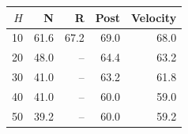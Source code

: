 \begin{tabular}{rrrrr}
\toprule
$H$ & N & R & Post & Velocity \\
\midrule
10 & 61.6 & 67.2 & 69.0 & 68.0 \\
20 & 48.0 & -- & 64.4 & 63.2 \\
30 & 41.0 & -- & 63.2 & 61.8 \\
40 & 41.0 & -- & 60.0 & 59.0 \\
50 & 39.2 & -- & 60.0 & 59.2 \\
\bottomrule
\end{tabular}
